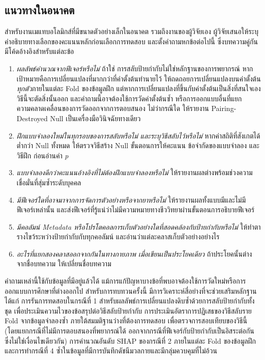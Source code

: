 \documentclass[11pt,a4paper]{article}
\begin{document}
\subsection{แนวทางในอนาคต}
สำหรับงานเมแทบอโลมิกส์ที่มีขนาดตัวอย่างเล็กในอนาคต รวมถึงงานของผู้วิจัยเอง
ผู้วิจัยเสนอให้ระบุคำอธิบายทางเลือกของคะแนนหลักก่อนเลือกการทดสอบ
และตั้งคำถามหกข้อต่อไปนี้ ซึ่งบทความคู่กันมีโค้ดอ้างอิงสำหรับแต่ละข้อ \cite{vyw}

\begin{enumerate}[label=\arabic*), leftmargin=*]
  \item \textit{ผลลัพธ์คำนวณจากฟีเจอร์หรือไม่} ถ้าใช่
        การสลับป้ายกำกับไม่ใช่หลักฐานของการพยากรณ์
        หากเป้าหมายคือการเปลี่ยนแปลงที่มากกว่าที่ค่าตั้งต้นทำนายไว้
        ให้ถดถอยการเปลี่ยนแปลงบนค่าตั้งต้น\textit{ทุกตัว}ภายในแต่ละ Fold ของข้อมูลฝึก
        แต่หากการเปลี่ยนแปลงที่ขึ้นกับค่าตั้งต้นเป็นสิ่งที่สนใจเอง วิธีนี้จะตัดสิ่งนั้นออก
        และคำถามนี้อาจต้องใช้การวัดค่าตั้งต้นซ้ำ
        หรือการออกแบบอื่นที่แยกความคลาดเคลื่อนของการวัดออกจากการตอบสนอง
        ไม่ว่ากรณีใด ให้รายงาน Pairing-Destroyed Null เป็นเครื่องมือวินิจฉัยทางเดียว
  \item \textit{ฝึกแบบจำลองใหม่ในทุกรอบของการสลับหรือไม่ และระบุวิธีสลับไว้หรือไม่}
        หากค่าสถิติที่สังเกตได้ต่ำกว่า Null ทั้งหมด ให้ตรวจวิธีสร้าง Null
        ขั้นตอนการให้คะแนน ข้อจำกัดของแบบจำลอง และวิธีฝึก ก่อนอ่านค่า \textit{p}
  \item \textit{แบบจำลองดีกว่าคะแนนอ้างอิงที่ไม่ต้องฝึกแบบจำลองหรือไม่}
        ให้รายงานผลต่างพร้อมช่วงความเชื่อมั่นที่สุ่มซ้ำระดับบุคคล
  \item \textit{มีฟีเจอร์ใดที่อาจมาจากการจัดการตัวอย่างหรือจากยาหรือไม่}
        ให้รายงานผลทั้งแบบมีและไม่มีฟีเจอร์เหล่านั้น
        และส่งฟีเจอร์ที่รู้แน่ว่าไม่มีความหมายทางชีววิทยาผ่านขั้นตอนการอธิบายฟีเจอร์
  \item \textit{มีคอลัมน์ Metadata หรือโปรโตคอลการเก็บตัวอย่างใดที่สอดคล้องกับป้ายกำกับหรือไม่}
        ให้ทำตารางไขว้ระหว่างป้ายกำกับกับทุกคอลัมน์ และอ่านว่าแต่ละคลาสเก็บตัวอย่างอย่างไร
  \item \textit{อะไรที่แยกสองคลาสออกจากกันในทางกายภาพ เมื่อเขียนเป็นประโยคเดียว}
        ถ้าประโยคนั้นต่างจากชื่อบทความ ให้เปลี่ยนชื่อบทความ
\end{enumerate}

คำถามเหล่านี้ใช้กับข้อมูลที่มีอยู่แล้วได้
แม้การแก้ปัญหาบางข้อที่พบอาจต้องใช้การวัดใหม่หรือการออกแบบการศึกษาที่ต่างออกไป
สำหรับการทบทวนครั้งนี้ มีการวิเคราะห์สี่อย่างที่จะช่วยเสริมหลักฐาน ได้แก่
การรันการทดสอบในกรณีที่ 1 สำหรับผลลัพธ์การเปลี่ยนแปลงดิบซ้ำด้วยการสลับป้ายกำกับทั้งชุด
เพื่อประเมินความไวของข้อสรุปต่อวิธีสลับป้ายกำกับ
การประเมินอัตราการปฏิเสธของวิธีสลับราย Fold จากข้อมูลจำลองซ้ำ
ภายใต้สมมติฐานว่างที่ต้องการทดสอบ เพื่อตรวจการสอบเทียบของวิธีนี้
(โดยแยกกรณีที่ไม่มีการตอบสนองที่พยากรณ์ได้ ออกจากกรณีที่ฟีเจอร์กับป้ายกำกับเป็นอิสระต่อกัน
ซึ่งไม่ใช่เงื่อนไขเดียวกัน)
การคำนวณอันดับ SHAP ของกรณีที่ 2 ภายในแต่ละ Fold ของข้อมูลฝึก
และการทำกรณีที่ 4 ซ้ำในข้อมูลที่มีการบันทึกดัชนีมวลกายและมีกลุ่มควบคุมที่ไม่อ้วน
\end{document}

